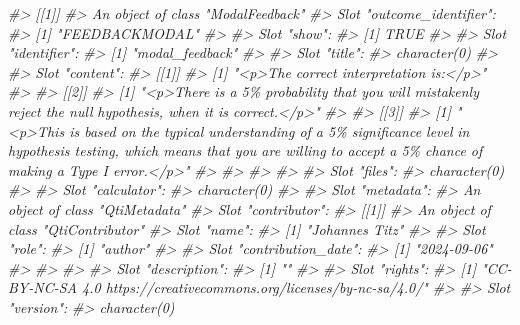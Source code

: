 \documentclass[twoside]{tufte-book}
\newenvironment{Shaded}{}{}
\newcommand{\CommentTok}[1]{\textcolor[rgb]{0.38,0.63,0.69}{\textit{#1}}}
\begin{document}
\begin{Shaded}
\begin{Highlighting}[]
\CommentTok{\#\textgreater{} [[1]]}
\CommentTok{\#\textgreater{} An object of class "ModalFeedback"}
\CommentTok{\#\textgreater{} Slot "outcome\_identifier":}
\CommentTok{\#\textgreater{} [1] "FEEDBACKMODAL"}
\CommentTok{\#\textgreater{} }
\CommentTok{\#\textgreater{} Slot "show":}
\CommentTok{\#\textgreater{} [1] TRUE}
\CommentTok{\#\textgreater{} }
\CommentTok{\#\textgreater{} Slot "identifier":}
\CommentTok{\#\textgreater{} [1] "modal\_feedback"}
\CommentTok{\#\textgreater{} }
\CommentTok{\#\textgreater{} Slot "title":}
\CommentTok{\#\textgreater{} character(0)}
\CommentTok{\#\textgreater{} }
\CommentTok{\#\textgreater{} Slot "content":}
\CommentTok{\#\textgreater{} [[1]]}
\CommentTok{\#\textgreater{} [1] "\textless{}p\textgreater{}The correct interpretation is:\textless{}/p\textgreater{}"}
\CommentTok{\#\textgreater{} }
\CommentTok{\#\textgreater{} [[2]]}
\CommentTok{\#\textgreater{} [1] "\textless{}p\textgreater{}There is a 5\% probability that you will mistakenly reject the null}
\CommentTok{hypothesis, when it is correct.\textless{}/p\textgreater{}"}
\CommentTok{\#\textgreater{} }
\CommentTok{\#\textgreater{} [[3]]}
\CommentTok{\#\textgreater{} [1] "\textless{}p\textgreater{}This is based on the typical understanding of a 5\% significance level}
\CommentTok{in hypothesis testing, which means that you are willing to accept a 5\% chance of}
\CommentTok{making a Type I error.\textless{}/p\textgreater{}"}
\CommentTok{\#\textgreater{} }
\CommentTok{\#\textgreater{} }
\CommentTok{\#\textgreater{} }
\CommentTok{\#\textgreater{} }
\CommentTok{\#\textgreater{} Slot "files":}
\CommentTok{\#\textgreater{} character(0)}
\CommentTok{\#\textgreater{} }
\CommentTok{\#\textgreater{} Slot "calculator":}
\CommentTok{\#\textgreater{} character(0)}
\CommentTok{\#\textgreater{} }
\CommentTok{\#\textgreater{} Slot "metadata":}
\CommentTok{\#\textgreater{} An object of class "QtiMetadata"}
\CommentTok{\#\textgreater{} Slot "contributor":}
\CommentTok{\#\textgreater{} [[1]]}
\CommentTok{\#\textgreater{} An object of class "QtiContributor"}
\CommentTok{\#\textgreater{} Slot "name":}
\CommentTok{\#\textgreater{} [1] "Johannes Titz"}
\CommentTok{\#\textgreater{} }
\CommentTok{\#\textgreater{} Slot "role":}
\CommentTok{\#\textgreater{} [1] "author"}
\CommentTok{\#\textgreater{} }
\CommentTok{\#\textgreater{} Slot "contribution\_date":}
\CommentTok{\#\textgreater{} [1] "2024{-}09{-}06"}
\CommentTok{\#\textgreater{} }
\CommentTok{\#\textgreater{} }
\CommentTok{\#\textgreater{} }
\CommentTok{\#\textgreater{} Slot "description":}
\CommentTok{\#\textgreater{} [1] ""}
\CommentTok{\#\textgreater{} }
\CommentTok{\#\textgreater{} Slot "rights":}
\CommentTok{\#\textgreater{} [1] "CC{-}BY{-}NC{-}SA 4.0 https://creativecommons.org/licenses/by{-}nc{-}sa/4.0/"}
\CommentTok{\#\textgreater{} }
\CommentTok{\#\textgreater{} Slot "version":}
\CommentTok{\#\textgreater{} character(0)}
\end{Highlighting}
\end{Shaded}
\end{document}
